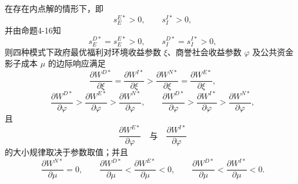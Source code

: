 \begin{proposition}[内点解情形下的参数敏感性比较]
在存在内点解的情形下，即
\[
s_E^{E*}>0,\qquad s_I^{I*}>0,
\]
并由命题4-16知
\[
s_E^{D*}=s_E^{E*}>0,\qquad s_I^{D*}=s_I^{I*}>0,
\]
则四种模式下政府最优福利对环境收益参数 \(\xi\)、商誉社会收益参数 \(\varphi\) 及公共资金影子成本 \(\mu\) 的边际响应满足
\[
\frac{\partial W^{D*}}{\partial \xi}
=
\frac{\partial W^{I*}}{\partial \xi}
>
\frac{\partial W^{N*}}{\partial \xi}
=
\frac{\partial W^{E*}}{\partial \xi},
\]
\[
\frac{\partial W^{D*}}{\partial \varphi}
>
\frac{\partial W^{E*}}{\partial \varphi}
>
\frac{\partial W^{N*}}{\partial \varphi},
\qquad
\frac{\partial W^{D*}}{\partial \varphi}
>
\frac{\partial W^{I*}}{\partial \varphi}
>
\frac{\partial W^{N*}}{\partial \varphi},
\]
且
\[
\frac{\partial W^{E*}}{\partial \varphi}
\quad\text{与}\quad
\frac{\partial W^{I*}}{\partial \varphi}
\]
的大小规律取决于参数取值；并且
\[
\frac{\partial W^{N*}}{\partial \mu}=0,\qquad
\frac{\partial W^{D*}}{\partial \mu}
<
\frac{\partial W^{E*}}{\partial \mu}<0,\qquad
\frac{\partial W^{D*}}{\partial \mu}
<
\frac{\partial W^{I*}}{\partial \mu}<0.
\]
\end{proposition}

